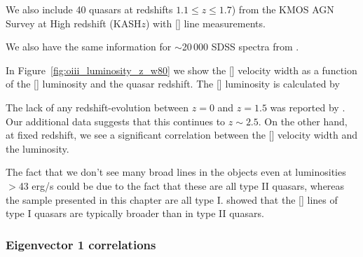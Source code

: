 We also include 40 quasars at redshifts $1.1 \leq z \leq 1.7$) from the KMOS \ac{AGN} Survey at High redshift (KASH$z$) with [] line measurements. 

We also have the same information for $\sim$20\,000 \ac{SDSS} spectra from \citet{mullaney13}. 

In Figure~\ref{fig:oiii_luminosity_z_w80} we show the [] velocity width as a function of the [] luminosity and the quasar redshift. 
The [] luminosity is calculated by 

The lack of any redshift-evolution between $z=0$ and $z=1.5$ was reported by \citet{harrison16}.
Our additional data suggests that this continues to $z\sim2.5$. 
On the other hand, at fixed redshift, we see a significant correlation between the [] velocity width and the luminosity. 

The fact that we don't see many broad lines in the \citet{zakamska14} objects even at luminosities $>$43 erg/s could be due to the fact that these are all type II quasars, whereas the sample presented in this chapter are all type I. 
\citet{mullaney13} showed that the [] lines of type I quasars are typically broader than in type II quasars. 



\subsubsection{Eigenvector 1 correlations}

